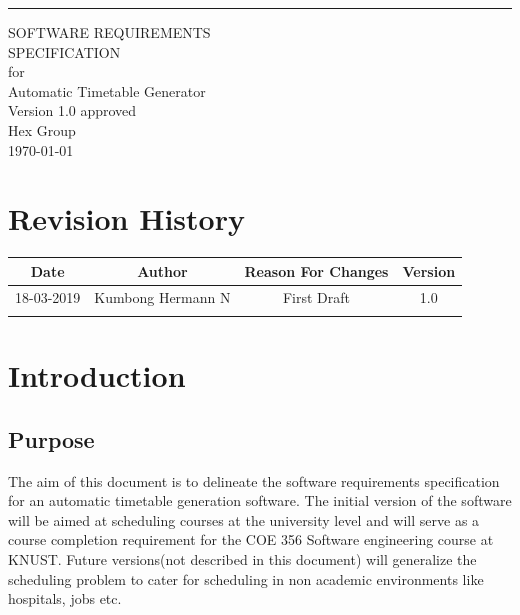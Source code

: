 \documentclass{scrreprt}
\date{}
\def\myversion{1.0 }
\begin{document}
\begin{flushright}
    \rule{16cm}{5pt}\vskip1cm
    \begin{bfseries}
        \Huge{SOFTWARE REQUIREMENTS\\ SPECIFICATION}\\
        \vspace{1.9cm}
        for\\
        \vspace{1.9cm}
        Automatic Timetable Generator\\
        \vspace{1.9cm}
        \LARGE{Version \myversion approved}\\
        \vspace{1.9cm}
        \vspace{1.9cm}
        Hex Group\\
        \vspace{1.9cm}
        \today\\
    \end{bfseries}
\end{flushright}

\tableofcontents


\chapter*{Revision History}

\begin{center}
    \begin{tabular}{|c|c|c|c|}
        \hline
	    Date & Author & Reason For Changes & Version\\
        \hline
	     18-03-2019& Kumbong Hermann N & First Draft & 1.0\\
        \hline
	     &   &  & \\
        \hline
    \end{tabular}
\end{center}

\chapter{Introduction}

\section{Purpose}
The aim of this document is to delineate the software requirements specification for an automatic timetable generation software. The initial version of the software will be aimed at scheduling courses  at the university level and will serve as a course completion requirement for the COE 356 Software engineering course at KNUST. Future versions(not described in this document) will generalize the scheduling problem to cater for scheduling in non academic environments like hospitals, jobs etc.
\end{document}
